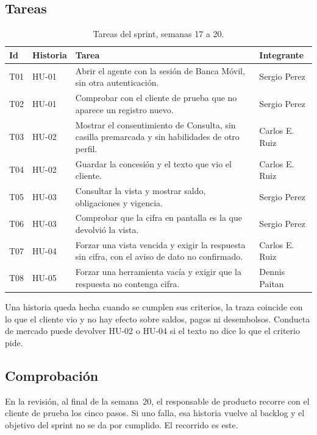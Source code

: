 \documentclass[11pt,a4paper]{article}
\begin{document}
\subsection{Tareas}

\begin{table}[H]
\centering
\caption{Tareas del sprint, semanas 17 a 20.}
\footnotesize
\setlength{\tabcolsep}{3.5pt}
\begin{tabularx}{\textwidth}{@{}l l X l@{}}
\toprule
\textbf{Id} & \textbf{Historia} & \textbf{Tarea} & \textbf{Integrante} \\
\midrule
T01 & HU-01 & Abrir el agente con la sesión de Banca Móvil, sin otra autenticación. & Sergio Perez \\
T02 & HU-01 & Comprobar con el cliente de prueba que no aparece un registro nuevo. & Sergio Perez \\
T03 & HU-02 & Mostrar el consentimiento de Consulta, sin casilla premarcada y sin habilidades de otro perfil. & Carlos E. Ruiz \\
T04 & HU-02 & Guardar la concesión y el texto que vio el cliente. & Carlos E. Ruiz \\
T05 & HU-03 & Consultar la vista y mostrar saldo, obligaciones y vigencia. & Sergio Perez \\
T06 & HU-03 & Comprobar que la cifra en pantalla es la que devolvió la vista. & Sergio Perez \\
T07 & HU-04 & Forzar una vista vencida y exigir la respuesta sin cifra, con el aviso de dato no confirmado. & Carlos E. Ruiz \\
T08 & HU-05 & Forzar una herramienta vacía y exigir que la respuesta no contenga cifra. & Dennis Paitan \\
\bottomrule
\end{tabularx}
\end{table}

Una historia queda hecha cuando se cumplen sus criterios, la traza coincide con lo que el cliente vio y no hay efecto sobre saldos, pagos ni desembolsos. Conducta de mercado puede devolver HU-02 o HU-04 si el texto no dice lo que el criterio pide.

\subsection{Comprobación}

En la revisión, al final de la semana~20, el responsable de producto recorre con el cliente de prueba los cinco pasos. Si uno falla, esa historia vuelve al backlog y el objetivo del sprint no se da por cumplido. El recorrido es este.
\end{document}
